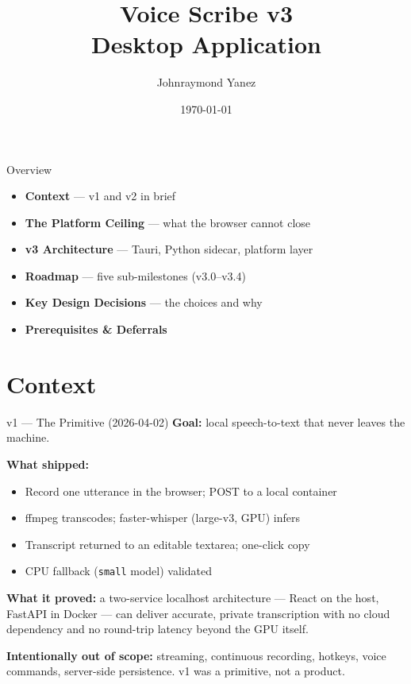 \documentclass{beamer}
\title[Voice Scribe v3]{Voice Scribe v3\\Desktop Application}
\author[J. Yanez]{Johnraymond Yanez}
\institute[Voice Scribe]{Voice Scribe}
\date{\today}
\begin{document}
\begin{frame}
\small{\titlepage}
\end{frame}


\begin{frame}{Overview}
    \begin{itemize}
        \item \textbf{Context} --- v1 and v2 in brief
        \item \textbf{The Platform Ceiling} --- what the browser cannot close
        \item \textbf{v3 Architecture} --- Tauri, Python sidecar, platform layer
        \item \textbf{Roadmap} --- five sub-milestones (v3.0--v3.4)
        \item \textbf{Key Design Decisions} --- the choices and why
        \item \textbf{Prerequisites \& Deferrals}
    \end{itemize}
\end{frame}


\section{Context}

\begin{frame}{v1 --- The Primitive (2026-04-02)}
    \small
    \textbf{Goal:} local speech-to-text that never leaves the machine.

    \vspace{0.4em}
    \textbf{What shipped:}
    \begin{itemize}\setlength{\itemsep}{2pt}
        \item Record one utterance in the browser; POST to a local container
        \item ffmpeg transcodes; faster-whisper (large-v3, GPU) infers
        \item Transcript returned to an editable textarea; one-click copy
        \item CPU fallback (\texttt{small} model) validated
    \end{itemize}

    \vspace{0.3em}
    \textbf{What it proved:} a two-service localhost architecture --- React on the host,
    FastAPI in Docker --- can deliver accurate, private transcription with no cloud dependency
    and no round-trip latency beyond the GPU itself.

    \vspace{0.3em}
    \textbf{Intentionally out of scope:} streaming, continuous recording, hotkeys, voice
    commands, server-side persistence. v1 was a primitive, not a product.
\end{frame}
\end{document}
